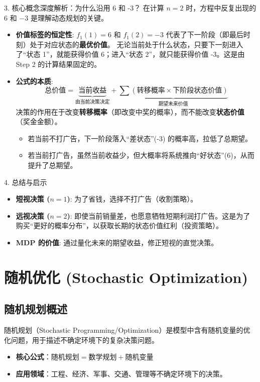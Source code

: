 \documentclass[a4paper,12pt]{ctexart} %
\begin{document}
	3. 核心概念深度解析：为什么沿用 6 和 -3？
	在计算 $n=2$ 时，方程中反复出现的 $6$ 和 $-3$ 是理解动态规划的关键。
	
	\begin{itemize}
		\item \textbf{价值标签的恒定性}: 
		$f_1(1)=6$ 和 $f_1(2)=-3$ 代表了下一阶段（即最后时刻）处于对应状态的\textbf{最优价值}。
		无论当前处于什么状态，只要下一刻进入了“状态 1”，就能获得价值 6；进入“状态 2”，就只能获得价值 -3。这是由 Step 2 的计算结果固定的。
		
		\item \textbf{公式的本质}:
		\[
		\text{总价值} = \underbrace{\text{当前收益}}_{\text{由当前决策决定}} + \underbrace{\sum (\text{转移概率} \times \text{下阶段状态价值})}_{\text{期望未来价值}}
		\]
		决策的作用在于改变\textbf{转移概率}（即改变中奖的概率），而不能改变\textbf{状态价值}（奖金金额）。
		\begin{itemize}
			\item 若当前不打广告，下一阶段落入“差状态”(-3) 的概率高，拉低了总期望。
			\item 若当前打广告，虽然当前收益少，但大概率将系统推向“好状态”(6)，从而提升了总期望。
		\end{itemize}
	\end{itemize}
	
	4. 总结与启示
	\begin{itemize}
		\item \textbf{短视决策 ($n=1$)}: 为了省钱，选择不打广告（收割策略）。
		\item \textbf{远视决策 ($n=2$)}: 即使当前销量差，也愿意牺牲短期利润打广告。这是为了购买“更好的概率分布”，以获取长期的状态价值红利（投资策略）。
		\item \textbf{MDP 的价值}: 通过量化未来的期望收益，修正短视的直觉决策。
	\end{itemize}
		
		
	
	\section{ 随机优化 (Stochastic Optimization)}
	
	\subsection{ 随机规划概述}
	随机规划（Stochastic Programming/Optimization）是模型中含有随机变量的优化问题，用于描述不确定环境下的复杂决策问题。
	\begin{itemize}
		\item \textbf{核心公式}：$\text{随机规划} = \text{数学规划} + \text{随机变量}$
		\item \textbf{应用领域}：工程、经济、军事、交通、管理等不确定环境下的决策。
	\end{itemize}
	
\end{document}
